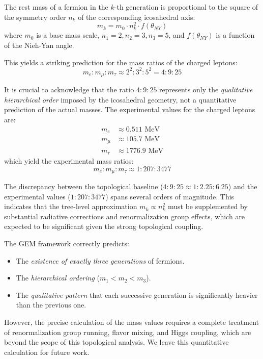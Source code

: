 \begin{proposition}
The rest mass of a fermion in the $k$-th generation is proportional to the square of the symmetry order $n_k$ of the corresponding icosahedral axis:
\begin{equation}
    m_k = m_0 \cdot n_k^2 \cdot f(\theta_{NY})
\end{equation}
where $m_0$ is a base mass scale, $n_1=2, n_2=3, n_3=5$, and $f(\theta_{NY})$ is a function of the Nieh-Yan angle. 
\end{proposition}

This yields a striking prediction for the mass ratios of the charged leptons:
\begin{equation}
    m_e : m_\mu : m_\tau \approx 2^2 : 3^2 : 5^2 = 4 : 9 : 25
\end{equation}

\begin{remark}
\label{rem:mass_comparison}
It is crucial to acknowledge that the ratio $4:9:25$ represents only the \textit{qualitative hierarchical order} imposed by the icosahedral geometry, not a quantitative prediction of the actual masses. The experimental values for the charged leptons are:
\begin{align}
    m_e &\approx 0.511 \text{ MeV} \\
    m_\mu &\approx 105.7 \text{ MeV} \\
    m_\tau &\approx 1776.9 \text{ MeV}
\end{align}
which yield the experimental mass ratios:
\begin{equation}
    m_e : m_\mu : m_\tau \approx 1 : 207 : 3477
\end{equation}

The discrepancy between the topological baseline ($4:9:25 \approx 1:2.25:6.25$) and the experimental values ($1:207:3477$) spans several orders of magnitude. This indicates that the tree-level approximation $m_k \propto n_k^2$ must be supplemented by substantial radiative corrections and renormalization group effects, which are expected to be significant given the strong topological coupling.

The GEM framework correctly predicts:
\begin{itemize}
    \item The \textit{existence of exactly three generations} of fermions.
    \item The \textit{hierarchical ordering} ($m_1 < m_2 < m_3$).
    \item The \textit{qualitative pattern} that each successive generation is significantly heavier than the previous one.
\end{itemize}

However, the precise calculation of the mass values requires a complete treatment of renormalization group running, flavor mixing, and Higgs coupling, which are beyond the scope of this topological analysis. We leave this quantitative calculation for future work.
\end{remark}

